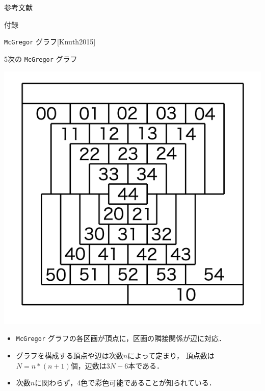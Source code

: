 \documentclass[dvipdfmx,11pt]{beamer}
\newcommand{\code}[1]{\lstinline[basicstyle=\ttfamily]{#1}}
\begin{document}

\begin{frame}[noframenumbering]{参考文献}
\end{frame}

\appendix
\begin{frame}[noframenumbering]{}
 \thispagestyle{empty}
 \Huge 付録
\end{frame}

\begin{frame}{ \code{McGregor} グラフ[Knuth2015]}
 \begin{exampleblock}{5次の \code{McGregor} グラフ}
  \begin{center}
   \includegraphics[scale=0.2]{fig/order5.png}
  \end{center}
 \end{exampleblock}

 \begin{itemize}
  \item \code{McGregor} グラフの各区画が頂点に，区画の隣接関係が辺に対応．
  \item グラフを構成する頂点や辺は次数$n$によって定まり，
	頂点数は$N=n*(n+1)$個，辺数は$3N-6$本である．\cite{Knuth:TAOCP:SAT}
  \item 次数$n$に関わらず，4色で彩色可能であることが知られている．
 \end{itemize}
\end{frame}
\end{document}
